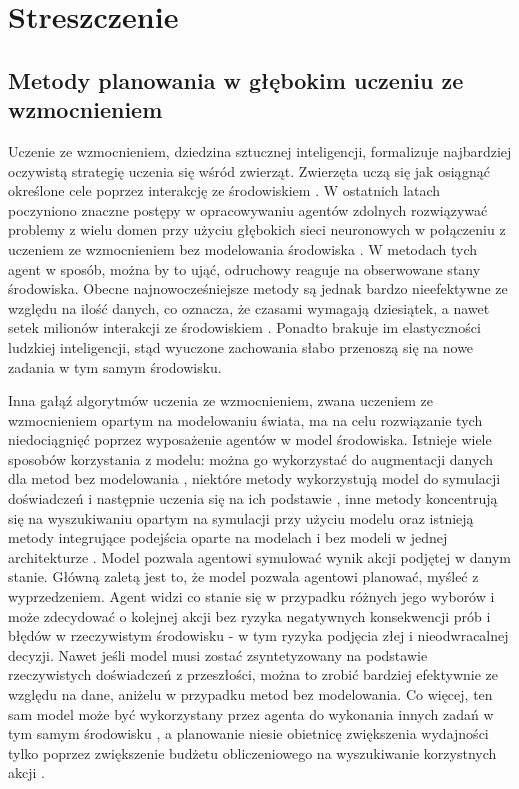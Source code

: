 \section*{Streszczenie}
\subsection*{Metody planowania w głębokim uczeniu ze wzmocnieniem}

Uczenie ze wzmocnieniem, dziedzina sztucznej inteligencji, formalizuje najbardziej oczywistą strategię uczenia się wśród zwierząt. Zwierzęta uczą się jak osiągnąć określone cele poprzez interakcję ze środowiskiem \cite{Book.RLAI}. W ostatnich latach poczyniono znaczne postępy w opracowywaniu agentów zdolnych rozwiązywać problemy z wielu domen przy użyciu głębokich sieci neuronowych w połączeniu z uczeniem ze wzmocnieniem bez modelowania środowiska \cite{Algo.Rainbow}\cite{Algo.A3C}\cite{Algo.PPO}. W metodach tych agent w sposób, można by to ująć, odruchowy reaguje na obserwowane stany środowiska. Obecne najnowocześniejsze metody są jednak bardzo nieefektywne ze względu na ilość danych, co oznacza, że ​​czasami wymagają dziesiątek, a nawet setek milionów interakcji ze środowiskiem \cite{Benchmark.RevisitingALE}. Ponadto brakuje im elastyczności ludzkiej inteligencji, stąd wyuczone zachowania słabo przenoszą się na nowe zadania w tym samym środowisku.

Inna gałąź algorytmów uczenia ze wzmocnieniem, zwana uczeniem ze wzmocnieniem opartym na modelowaniu świata, ma na celu rozwiązanie tych niedociągnięć poprzez wyposażenie agentów w model środowiska. Istnieje wiele sposobów korzystania z modelu: można go wykorzystać do augmentacji danych dla metod bez modelowania \cite{Algo.MBVE}, niektóre metody wykorzystują model do symulacji doświadczeń i następnie uczenia się na ich podstawie \cite{Algo.WorldModels}, inne metody koncentrują się na wyszukiwaniu opartym na symulacji przy użyciu modelu \cite{Algo.AlphaZero} oraz istnieją metody integrujące podejścia oparte na modelach i bez modeli w jednej architekturze \cite{Algo.I2A}. Model pozwala agentowi symulować wynik akcji podjętej w danym stanie. Główną zaletą jest to, że model pozwala agentowi planować, myśleć z wyprzedzeniem. Agent widzi co stanie się w przypadku różnych jego wyborów i może zdecydować o kolejnej akcji bez ryzyka negatywnych konsekwencji prób i błędów w rzeczywistym środowisku - w tym ryzyka podjęcia złej i nieodwracalnej decyzji. Nawet jeśli model musi zostać zsyntetyzowany na podstawie rzeczywistych doświadczeń z przeszłości, można to zrobić bardziej efektywnie ze względu na dane, aniżelu w przypadku metod bez modelowania. Co więcej, ten sam model może być wykorzystany przez agenta do wykonania innych zadań w tym samym środowisku \cite{Algo.I2A}, a planowanie niesie obietnicę zwiększenia wydajności tylko poprzez zwiększenie budżetu obliczeniowego na wyszukiwanie korzystnych akcji \cite{Algo.AlphaGoZero}.


